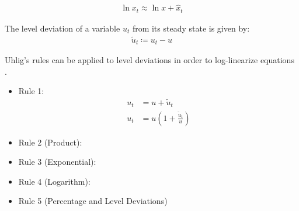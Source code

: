 \documentclass[
thesis.tex
]{subfiles}
\begin{document}
\begin{corollary}\label{coro:logarithm-rule}
	
	\begin{align*}
		\ln x_t \approx \ln x + \hat{x}_t
	\end{align*}
	
\end{corollary}


\begin{definition}\label{def:level-deviation}
	
	The level deviation of a variable $u_t$ from its steady state is given by: \cite[Lecture 9, p.9]{solis-garcia_ucb_2022}
	\begin{align}
		\widetilde{u}_t \coloneq u_t - u \label{eq:level-deviation}
	\end{align}
	
\end{definition}


\begin{lemma}\label{lemma:level-rules}
	
	Uhlig's rules can be applied to level deviations in order to log-linearize equations \cite[Lecture 6, p.2]{solis-garcia_ucb_2022}.
	
	\begin{itemize}
		\item Rule 1:
		\begin{align}
			\label{lemma:level-rule-1a}
			u_t &= u + \widetilde{u}_t \\
			\label{lemma:level-rule-1b}
			u_t &= u\left(1+ \frac{\widetilde{u}_t}{u} \right)
		\end{align}
		
		\item Rule 2 (Product):
		
		\item Rule 3 (Exponential):
		
		\item Rule 4 (Logarithm):
		
		\item Rule 5 (Percentage and Level Deviations)
		
	\end{itemize}
	
\end{lemma}
\end{document}
